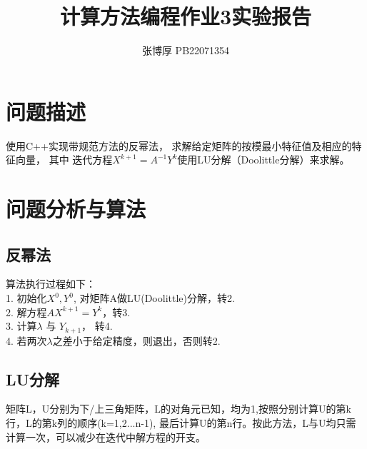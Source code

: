 \documentclass[12pt,a4paper,oneside]{article}
\title{计算方法编程作业3实验报告}
\author{张博厚 PB22071354}
\date{}
\begin{document}
\maketitle
\tableofcontents
\newpage

\section{问题描述}
使用C++实现带规范方法的反幂法， 求解给定矩阵的按模最小特征值及相应的特征向量， 其中
迭代方程$X^{k+1} = A^{-1}Y^k$使用LU分解（Doolittle分解）来求解。

\section{问题分析与算法}
\subsection{反幂法}
\noindent
算法执行过程如下：\\
1. 初始化$X^0, Y^0$, 对矩阵A做LU(Doolittle)分解，转2.\\
2. 解方程$AX^{k+1} = Y^k$，转3.\\
3. 计算$\lambda$ 与 $Y_{k+1}$， 转4.\\
4. 若两次$\lambda$之差小于给定精度，则退出，否则转2.
\subsection{LU分解}
矩阵L，U分别为下/上三角矩阵，L的对角元已知，均为1,按照分别计算U的第k行，L的第k列的顺序(k=1,2...n-1),
最后计算U的第n行。按此方法，L与U均只需计算一次，可以减少在迭代中解方程的开支。
\end{document}
